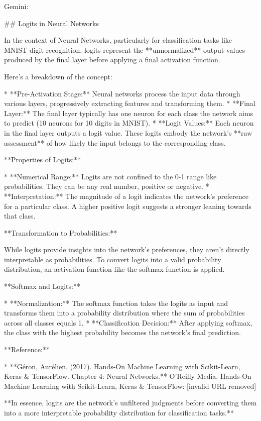 Gemini:

## Logits in Neural Networks

In the context of Neural Networks, particularly for classification tasks like MNIST digit recognition, logits represent the **unnormalized** output values produced by the final layer before applying a final activation function. 

Here's a breakdown of the concept:

* **Pre-Activation Stage:** Neural networks process the input data through various layers, progressively extracting features and transforming them. 
* **Final Layer:** The final layer typically has one neuron for each class the network aims to predict (10 neurons for 10 digits in MNIST).
* **Logit Values:** Each neuron in the final layer outputs a logit value. These logits embody the network's **raw assessment** of how likely the input belongs to the corresponding class. 

**Properties of Logits:**

* **Numerical Range:** Logits are not confined to the 0-1 range like probabilities. They can be any real number, positive or negative.
* **Interpretation:** The magnitude of a logit indicates the network's preference for a particular class. A higher positive logit suggests a stronger leaning towards that class.

**Transformation to Probabilities:**

While logits provide insights into the network's preferences, they aren't directly interpretable as probabilities. To convert logits into a valid probability distribution, an activation function like the softmax function is applied.

**Softmax and Logits:**

* **Normalization:** The softmax function takes the logits as input and transforms them into a probability distribution where the sum of probabilities across all classes equals 1.
* **Classification Decision:**  After applying softmax, the class with the highest probability becomes the network's final prediction.

**Reference:**

* **Géron, Aurélien. (2017). Hands-On Machine Learning with Scikit-Learn, Keras & TensorFlow. Chapter 4: Neural Networks.** O'Reilly Media. Hands-On Machine Learning with Scikit-Learn, Keras & TensorFlow: [invalid URL removed]

**In essence, logits are the network's unfiltered judgments before converting them into a more interpretable probability distribution for classification tasks.**

